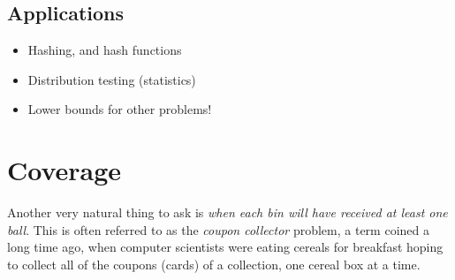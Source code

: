 \subsection{Applications}

\begin{itemize}
    \item Hashing, and hash functions
    \item Distribution testing (statistics)
    \item Lower bounds for other problems!
\end{itemize}

\section{Coverage}
Another very natural thing to ask is \emph{when each bin will have received at least one ball}. This is often referred to as the \emph{coupon collector} problem, a term coined a long time ago, when computer scientists were eating cereals for breakfast hoping to collect all of the coupons (cards) of a collection, one cereal box at a time.

